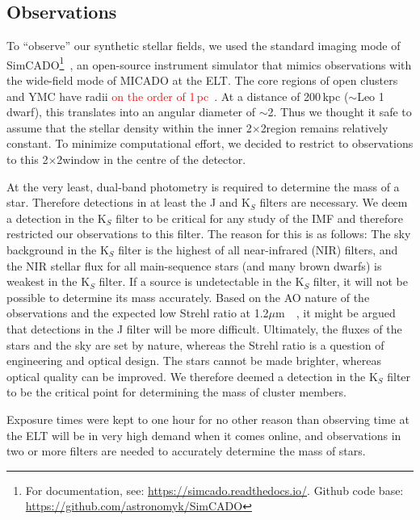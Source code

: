 \documentclass[referee]{aa}
\newcommand{\um}{$\mu$m~}
\newcommand{\s}{$\sim$}
\newcommand{\langedit}[1]{\textcolor{red}{#1}}
\begin{document}
\subsection{Observations}
\label{sec:telescope}

To ``observe'' our synthetic stellar fields, we used the standard imaging mode of SimCADO\footnote{For documentation, see: \url{https://simcado.readthedocs.io/}.
Github code base: \url{https://github.com/astronomyk/SimCADO}}~\citep{leschinski2016}, an open-source instrument simulator that mimics observations with the wide-field mode of MICADO at the ELT\@.
The core regions of open clusters and YMC have radii \langedit{on the order of 1\,pc}~\citep{portegies2010}.
At a distance of 200\,kpc ($\sim$Leo 1 dwarf), this translates into an angular diameter of \s2\arcsec.
Thus we thought it safe to assume that the stellar density within the inner 2\arcsec$\times$2\arcsec region remains relatively constant.
To minimize computational effort, we decided to restrict to observations to this 2\arcsec$\times$2\arcsec window in the centre of the detector.

At the very least, dual-band photometry is required to determine the mass of a star.
Therefore detections in at least the J and K$_S$ filters are necessary.
We deem a detection in the K$_S$ filter to be critical for any study of the IMF and therefore restricted our observations to this filter.
The reason for this is as follows: The sky background in the K$_S$ filter is the highest of all near-infrared (NIR) filters, and the NIR stellar flux for all main-sequence stars (and many brown dwarfs) is weakest in the K$_S$ filter.
If a source is undetectable in the K$_S$ filter, it will not be possible to determine its mass accurately.
Based on the AO nature of the observations and the expected low Strehl ratio at 1.2\um~\citep{clenet2016}, it might be argued that detections in the J filter will be more difficult.
Ultimately, the fluxes of the stars and the sky are set by nature, whereas the Strehl ratio is a question of engineering and optical design.
The stars cannot be made brighter, whereas optical quality can be improved.
We therefore deemed a detection in the K$_S$ filter to be the critical point for determining the mass of cluster members.

Exposure times were kept to one hour for no other reason than observing time at the ELT will be in very high demand when it comes online, and observations in two or more filters are needed to accurately determine the mass of stars.
\end{document}
